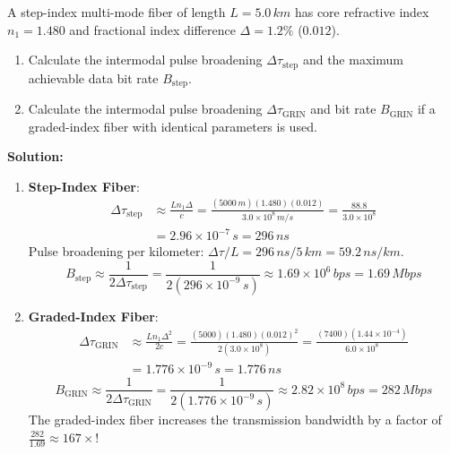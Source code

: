 \begin{example}
A step-index multi-mode fiber of length $L = 5.0\,\si{km}$ has core refractive index $n_1 = 1.480$ and fractional index difference $\Delta = 1.2\%$ ($0.012$).
\begin{enumerate}
    \item Calculate the intermodal pulse broadening $\Delta \tau_{\text{step}}$ and the maximum achievable data bit rate $B_{\text{step}}$.
    \item Calculate the intermodal pulse broadening $\Delta \tau_{\text{GRIN}}$ and bit rate $B_{\text{GRIN}}$ if a graded-index fiber with identical parameters is used.
\end{enumerate}

\textbf{Solution:}
\begin{enumerate}
    \item \textbf{Step-Index Fiber}:
    \begin{align*}
        \Delta \tau_{\text{step}} &\approx \frac{L n_1 \Delta}{c} = \frac{(5000\,\si{m})(1.480)(0.012)}{3.0 \times 10^8\,\si{m/s}} = \frac{88.8}{3.0 \times 10^8} \\
        &= 2.96 \times 10^{-7}\,\si{s} = 296\,\si{ns}
    \end{align*}
    Pulse broadening per kilometer: $\Delta \tau / L = 296\,\si{ns} / 5\,\si{km} = 59.2\,\si{ns/km}$.
    \begin{equation*}
        B_{\text{step}} \approx \frac{1}{2\Delta \tau_{\text{step}}} = \frac{1}{2(296 \times 10^{-9}\,\si{s})} \approx 1.69 \times 10^6\,\si{bps} = 1.69\,\si{Mbps}
    \end{equation*}
    
    \item \textbf{Graded-Index Fiber}:
    \begin{align*}
        \Delta \tau_{\text{GRIN}} &\approx \frac{L n_1 \Delta^2}{2 c} = \frac{(5000)(1.480)(0.012)^2}{2(3.0 \times 10^8)} = \frac{(7400)(1.44 \times 10^{-4})}{6.0 \times 10^8} \\
        &= 1.776 \times 10^{-9}\,\si{s} = 1.776\,\si{ns}
    \end{align*}
    \begin{equation*}
        B_{\text{GRIN}} \approx \frac{1}{2\Delta \tau_{\text{GRIN}}} = \frac{1}{2(1.776 \times 10^{-9}\,\si{s})} \approx 2.82 \times 10^8\,\si{bps} = 282\,\si{Mbps}
    \end{equation*}
    The graded-index fiber increases the transmission bandwidth by a factor of $\frac{282}{1.69} \approx 167\times$!
\end{enumerate}
\end{example}

